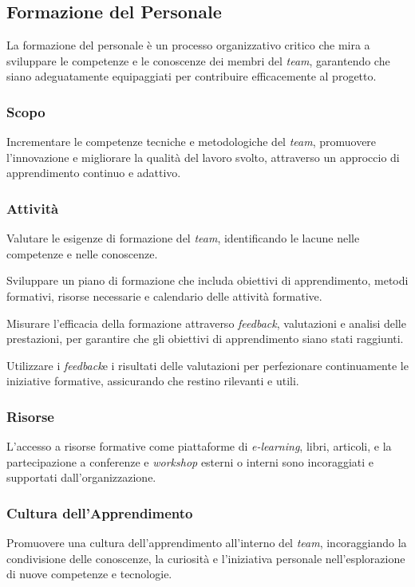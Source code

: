 \subsection{Formazione del Personale}

La formazione del personale è un processo organizzativo critico che mira a
sviluppare le competenze e le conoscenze dei membri del \textit{team}, garantendo che
siano adeguatamente equipaggiati per contribuire efficacemente al progetto.

\subsubsection{Scopo}
Incrementare le competenze tecniche e metodologiche del \textit{team}, promuovere
l'innovazione e migliorare la qualità del lavoro svolto, attraverso un approccio
di apprendimento continuo e adattivo.

\subsubsection{Attività}
Valutare le esigenze di
	  formazione del \textit{team}, identificando le lacune nelle competenze e nelle
	  conoscenze.

Sviluppare un piano di
	  formazione che includa obiettivi di apprendimento, metodi formativi,
	  risorse necessarie e calendario delle attività formative.



Misurare l'efficacia della
	  formazione attraverso \textit{feedback}\g, valutazioni e analisi delle
	  prestazioni, per garantire che gli obiettivi di apprendimento siano
	  stati raggiunti.

Utilizzare i \textit{feedback}\g e i
	  risultati delle valutazioni per perfezionare continuamente le
	  iniziative formative, assicurando che restino rilevanti e utili.

\subsubsection{Risorse}
L'accesso a risorse formative come piattaforme di \textit{e-learning}, libri,
articoli, e la partecipazione a conferenze e \textit{workshop} esterni o interni
sono incoraggiati e supportati dall'organizzazione.

\subsubsection{Cultura dell'Apprendimento}
Promuovere una cultura dell'apprendimento all'interno del \textit{team}, incoraggiando
la condivisione delle conoscenze, la curiosità e l'iniziativa personale
nell'esplorazione di nuove competenze e tecnologie.
